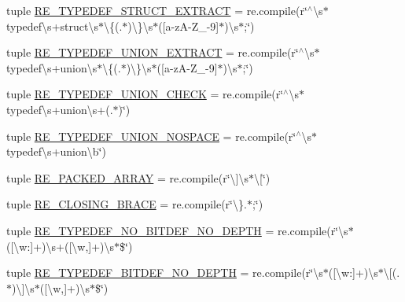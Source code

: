 \begin{DoxyCompactItemize}
\item 
tuple \hyperlink{namespacesrc_1_1regex_a55c447db66ba7f394b0bc0450c2cde5c}{R\-E\-\_\-\-T\-Y\-P\-E\-D\-E\-F\-\_\-\-S\-T\-R\-U\-C\-T\-\_\-\-E\-X\-T\-R\-A\-C\-T} = re.\-compile(r\char`\"{}$^\wedge$\textbackslash{}s$\ast$typedef\textbackslash{}s+struct\textbackslash{}s$\ast$\textbackslash{}\{(.$\ast$)\textbackslash{}\}\textbackslash{}s$\ast$(\mbox{[}a-\/z\-A-\/Z\-\_-\/9\mbox{]}$\ast$)\textbackslash{}s$\ast$;\char`\"{})
\item 
tuple \hyperlink{namespacesrc_1_1regex_a47015bb89029c41716cd0988f3621ae6}{R\-E\-\_\-\-T\-Y\-P\-E\-D\-E\-F\-\_\-\-U\-N\-I\-O\-N\-\_\-\-E\-X\-T\-R\-A\-C\-T} = re.\-compile(r\char`\"{}$^\wedge$\textbackslash{}s$\ast$typedef\textbackslash{}s+union\textbackslash{}s$\ast$\textbackslash{}\{(.$\ast$)\textbackslash{}\}\textbackslash{}s$\ast$(\mbox{[}a-\/z\-A-\/Z\-\_-\/9\mbox{]}$\ast$)\textbackslash{}s$\ast$;\char`\"{})
\item 
tuple \hyperlink{namespacesrc_1_1regex_ac837f014881b63defbf22c657550a43f}{R\-E\-\_\-\-T\-Y\-P\-E\-D\-E\-F\-\_\-\-U\-N\-I\-O\-N\-\_\-\-C\-H\-E\-C\-K} = re.\-compile(r\char`\"{}$^\wedge$\textbackslash{}s$\ast$typedef\textbackslash{}s+union\textbackslash{}s+(.$\ast$)\char`\"{})
\item 
tuple \hyperlink{namespacesrc_1_1regex_ac6e919ca3e8ba2edbee446722fe8ffdd}{R\-E\-\_\-\-T\-Y\-P\-E\-D\-E\-F\-\_\-\-U\-N\-I\-O\-N\-\_\-\-N\-O\-S\-P\-A\-C\-E} = re.\-compile(r\char`\"{}$^\wedge$\textbackslash{}s$\ast$typedef\textbackslash{}s+union\textbackslash{}b\char`\"{})
\item 
tuple \hyperlink{namespacesrc_1_1regex_a8ab431b189b258df06951b5b38371936}{R\-E\-\_\-\-P\-A\-C\-K\-E\-D\-\_\-\-A\-R\-R\-A\-Y} = re.\-compile(r\char`\"{}\textbackslash{}\mbox{]}\textbackslash{}s$\ast$\textbackslash{}\mbox{[}\char`\"{})
\item 
tuple \hyperlink{namespacesrc_1_1regex_af6fc08b34cd9ab90ca4f1dc0b82f8120}{R\-E\-\_\-\-C\-L\-O\-S\-I\-N\-G\-\_\-\-B\-R\-A\-C\-E} = re.\-compile(r\char`\"{}\textbackslash{}\}.$\ast$;\char`\"{})
\item 
tuple \hyperlink{namespacesrc_1_1regex_ae708653bd993d243472b411534bab724}{R\-E\-\_\-\-T\-Y\-P\-E\-D\-E\-F\-\_\-\-N\-O\-\_\-\-B\-I\-T\-D\-E\-F\-\_\-\-N\-O\-\_\-\-D\-E\-P\-T\-H} = re.\-compile(r\char`\"{}\textbackslash{}s$\ast$(\mbox{[}\textbackslash{}w\-:\mbox{]}+)\textbackslash{}s+(\mbox{[}\textbackslash{}w,\mbox{]}+)\textbackslash{}s$\ast$\$\char`\"{})
\item 
tuple \hyperlink{namespacesrc_1_1regex_acc4865a439bc7517e73389dd819374e2}{R\-E\-\_\-\-T\-Y\-P\-E\-D\-E\-F\-\_\-\-B\-I\-T\-D\-E\-F\-\_\-\-N\-O\-\_\-\-D\-E\-P\-T\-H} = re.\-compile(r\char`\"{}\textbackslash{}s$\ast$(\mbox{[}\textbackslash{}w\-:\mbox{]}+)\textbackslash{}s$\ast$\textbackslash{}\mbox{[}(.$\ast$)\textbackslash{}\mbox{]}\textbackslash{}s$\ast$(\mbox{[}\textbackslash{}w,\mbox{]}+)\textbackslash{}s$\ast$\$\char`\"{})

\end{DoxyCompactItemize}

